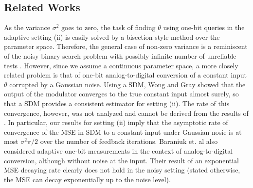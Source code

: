 \documentclass[letterpaper, conference, 11pt]{IEEEtran}      %
\begin{document}
\subsection*{Related Works}
As the variance $\sigma^2$ goes to zero, the task of finding $\theta$ using one-bit queries in the adaptive setting (ii) is easily solved by a bisection style method over the parameter space. Therefore, the general case of non-zero variance is a reminiscent of the noisy binary search problem with possibly infinite number of unreliable tests \cite{cicalese2002least, Karp:2007:NBS:1283383.1283478}. However, since we assume a continuous parameter space, a more closely related problem is that of one-bit analog-to-digital conversion of a constant input $\theta$ corrupted by a Gaussian noise. Using a SDM, Wong and Gray \cite{53738} showed that the output of the modulator converges to the true constant input almost surely, so that a SDM provides a consistent estimator for setting (ii). The rate of this convergence, however, was not analyzed and cannot be derived from the results of \cite{53738}. In particular, our results for setting (ii) imply that the asymptotic rate of convergence of the MSE in SDM to a constant input under Gaussian nosie is at most $\sigma^2\pi/2$ over the number of feedback iterations. Baraniuk et. al \cite{baraniuk2017exponential} also considered adaptive one-bit measurements in the context of analog-to-digital conversion, although without noise at the input. Their result of an exponential MSE decaying rate clearly does not hold in the noisy setting (stated otherwise, the MSE can decay exponentially up to the noise level). 
\\
\end{document}
